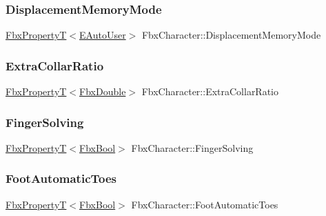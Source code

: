 \subsubsection{\texorpdfstring{Displacement\+Memory\+Mode}{DisplacementMemoryMode}}
{\footnotesize\ttfamily \hyperlink{class_fbx_property_t}{Fbx\+PropertyT}$<$\hyperlink{class_fbx_character_a5b03462709a82a15d89ee4563a4c49df}{E\+Auto\+User}$>$ Fbx\+Character\+::\+Displacement\+Memory\+Mode}

\mbox{\label{class_fbx_character_a49b43a339e47ff3366081d5743f30d38}} 
\subsubsection{\texorpdfstring{Extra\+Collar\+Ratio}{ExtraCollarRatio}}
{\footnotesize\ttfamily \hyperlink{class_fbx_property_t}{Fbx\+PropertyT}$<$\hyperlink{fbxtypes_8h_a171e72a1c46fc15c1a6c9c31948c1c5b}{Fbx\+Double}$>$ Fbx\+Character\+::\+Extra\+Collar\+Ratio}

\mbox{\label{class_fbx_character_a1d329d6b89abc23f5f966a28b1bd3194}} 
\subsubsection{\texorpdfstring{Finger\+Solving}{FingerSolving}}
{\footnotesize\ttfamily \hyperlink{class_fbx_property_t}{Fbx\+PropertyT}$<$\hyperlink{fbxtypes_8h_a92e0562b2fe33e76a242f498b362262e}{Fbx\+Bool}$>$ Fbx\+Character\+::\+Finger\+Solving}

\mbox{\label{class_fbx_character_ae01ebb9daadf7c434629ebd51c1c1d9b}} 
\subsubsection{\texorpdfstring{Foot\+Automatic\+Toes}{FootAutomaticToes}}
{\footnotesize\ttfamily \hyperlink{class_fbx_property_t}{Fbx\+PropertyT}$<$\hyperlink{fbxtypes_8h_a92e0562b2fe33e76a242f498b362262e}{Fbx\+Bool}$>$ Fbx\+Character\+::\+Foot\+Automatic\+Toes}

